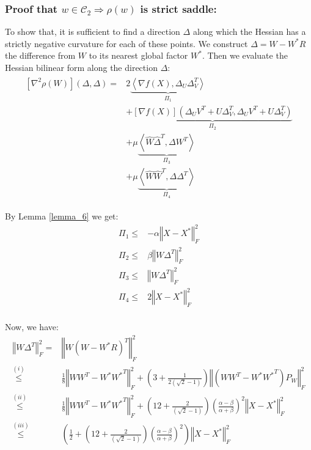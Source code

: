 \documentclass{article}
\begin{document}
\subsubsection{Proof that $w \in \mathcal{C}_2\Rightarrow \rho\left(w\right)$ is strict saddle:}

To show that, it is sufficient to find a direction $\Delta$ along which the Hessian has a strictly negative curvature for each of these points. We construct $\Delta = W-W^*R$ the difference from $W$ to its nearest global factor $W^*$. Then we evaluate the Hessian bilinear form along the direction $\Delta$:
\begin{align}\label{bilinear_form}
\begin{split}
    \left[\nabla^2\rho\left(W\right)\right]\left(\Delta,\Delta\right)= &
    2\underbrace{\left\langle \nabla f\left(X\right),\Delta_{U}\Delta_{V}^{T}\right\rangle }_{\Pi_{1}}\\
    & +\underbrace{\left[\nabla f\left(X\right)\right]\left(\Delta_{U}V^{T}+U\Delta_{V}^{T},\Delta_{U}V^{T}+U\Delta_{V}^{T}\right)}_{\Pi_{2}} \\
    & + \mu\underbrace{\left\langle \hat{W}\hat{\Delta}^{T},\Delta W^{T}\right\rangle }_{\Pi_{3}}\\
    & + \mu\underbrace{\left\langle \hat{W}\hat{W}^{T},\Delta\Delta^{T}\right\rangle }_{\Pi_{4}}
\end{split}
\end{align}

By Lemma \ref{lemma_6} we get: 
\begin{align*}
    \Pi_1 \le & -\alpha\left\Vert X-X^*\right\Vert^2_F \\
    \Pi_2 \le & \beta\left\Vert W\Delta^T\right\Vert^2_F \\
    \Pi_3 \le & \left\Vert W\Delta^T\right\Vert^2_F \\
    \Pi_4 \le & 2\left\Vert X-X^*\right\Vert^2_F \\
\end{align*}

Now, we have:
\begin{align*} 
    \left\Vert W\Delta^T\right\Vert^2_F = & \left\Vert W\left(W-W^*R\right)^T\right\Vert^2_F \\
    \overset{\left(i\right)}{\le} & \frac{1}{8}\left\Vert WW^T-W^*{W^*}^T\right\Vert^2_F + \left(3 + \frac{1}{2\left(\sqrt{2}- 1\right)}\right)\left\Vert \left(WW^T-W^*{W^*}^T\right)P_W\right\Vert^2_F\\
    \overset{\left(ii\right)}{\le} & \frac{1}{8}\left\Vert WW^T-W^*{W^*}^T\right\Vert^2_F + \left(12 + \frac{2}{\left(\sqrt{2}- 1\right)}\right)\left(\frac{\alpha - \beta}{\alpha + \beta}\right)^2\left\Vert X-X^*\right\Vert_F^2\\
    \overset{\left(iii\right)}{\le} & \left(\frac{1}{2} + \left(12 + \frac{2}{\left(\sqrt{2}- 1\right)}\right)\left(\frac{\alpha - \beta}{\alpha + \beta}\right)^2\right)\left\Vert X-X^*\right\Vert_F^2
\end{align*}
\end{document}
